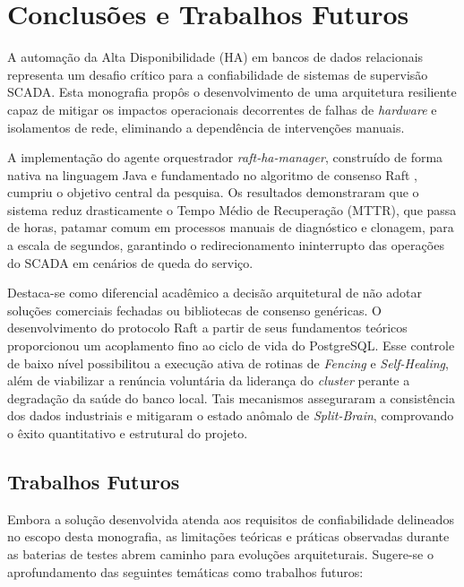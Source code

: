 \chapter{Conclusões e Trabalhos Futuros} 
\label{cap:conclusao}

A automação da Alta Disponibilidade (HA) em bancos de dados relacionais representa um desafio crítico para a confiabilidade de sistemas de supervisão SCADA. Esta monografia propôs o desenvolvimento de uma arquitetura resiliente capaz de mitigar os impactos operacionais decorrentes de falhas de \textit{hardware} e isolamentos de rede, eliminando a dependência de intervenções manuais.

A implementação do agente orquestrador \textit{raft-ha-manager}, construído de forma nativa na linguagem Java e fundamentado no algoritmo de consenso Raft \cite{raft2014}, cumpriu o objetivo central da pesquisa. Os resultados demonstraram que o sistema reduz drasticamente o Tempo Médio de Recuperação (MTTR), que passa de horas, patamar comum em processos manuais de diagnóstico e clonagem, para a escala de segundos, garantindo o redirecionamento ininterrupto das operações do SCADA em cenários de queda do serviço.

Destaca-se como diferencial acadêmico a decisão arquitetural de não adotar soluções comerciais fechadas ou bibliotecas de consenso genéricas. O desenvolvimento do protocolo Raft a partir de seus fundamentos teóricos proporcionou um acoplamento fino ao ciclo de vida do PostgreSQL. Esse controle de baixo nível possibilitou a execução ativa de rotinas de \textit{Fencing} e \textit{Self-Healing}, além de viabilizar a renúncia voluntária da liderança do \textit{cluster} perante a degradação da saúde do banco local. Tais mecanismos asseguraram a consistência dos dados industriais e mitigaram o estado anômalo de \textit{Split-Brain}, comprovando o êxito quantitativo e estrutural do projeto.

\section{Trabalhos Futuros}

Embora a solução desenvolvida atenda aos requisitos de confiabilidade delineados no escopo desta monografia, as limitações teóricas e práticas observadas durante as baterias de testes abrem caminho para evoluções arquiteturais. Sugere-se o aprofundamento das seguintes temáticas como trabalhos futuros:

